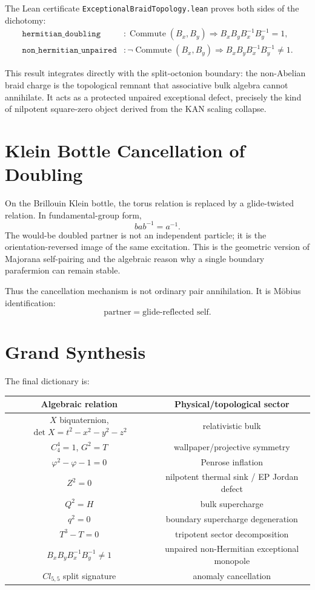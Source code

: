 The Lean certificate \texttt{ExceptionalBraidTopology.lean} proves both sides of the dichotomy:
\begin{align}
    \texttt{hermitian\_doubling} &: \operatorname{Commute}(B_x,B_y)\Rightarrow B_xB_yB_x^{-1}B_y^{-1}=1,\\
    \texttt{non\_hermitian\_unpaired} &: \neg\operatorname{Commute}(B_x,B_y)\Rightarrow B_xB_yB_x^{-1}B_y^{-1}\neq1.
\end{align}

This result integrates directly with the split-octonion boundary: the non-Abelian braid charge is the topological remnant that associative bulk algebra cannot annihilate.  It acts as a protected unpaired exceptional defect, precisely the kind of nilpotent square-zero object derived from the KAN scaling collapse.

\section{Klein Bottle Cancellation of Doubling}

On the Brillouin Klein bottle, the torus relation is replaced by a glide-twisted relation.  In fundamental-group form,
\begin{equation}
    b a b^{-1}=a^{-1}.
\end{equation}
The would-be doubled partner is not an independent particle; it is the orientation-reversed image of the same excitation.  This is the geometric version of Majorana self-pairing and the algebraic reason why a single boundary parafermion can remain stable.

Thus the cancellation mechanism is not ordinary pair annihilation.  It is Möbius identification:
\begin{equation}
    \text{partner}=\text{glide-reflected self}.
\end{equation}

\section{Grand Synthesis}

The final dictionary is:
\begin{center}
\begin{tabular}{c|c}
\textbf{Algebraic relation} & \textbf{Physical/topological sector} \\
\hline
$X$ biquaternion, $\det X=t^2-x^2-y^2-z^2$ & relativistic bulk \\
$C_4^4=1$, $G^2=T$ & wallpaper/projective symmetry \\
$\varphi^2-\varphi-1=0$ & Penrose inflation \\
$Z^2=0$ & nilpotent thermal sink / EP Jordan defect \\
$Q^2=H$ & bulk supercharge \\
$q^2=0$ & boundary supercharge degeneration \\
$T^3-T=0$ & tripotent sector decomposition \\
$B_xB_yB_x^{-1}B_y^{-1}\neq1$ & unpaired non-Hermitian exceptional monopole \\
$Cl_{5,5}$ split signature & anomaly cancellation
\end{tabular}
\end{center}

